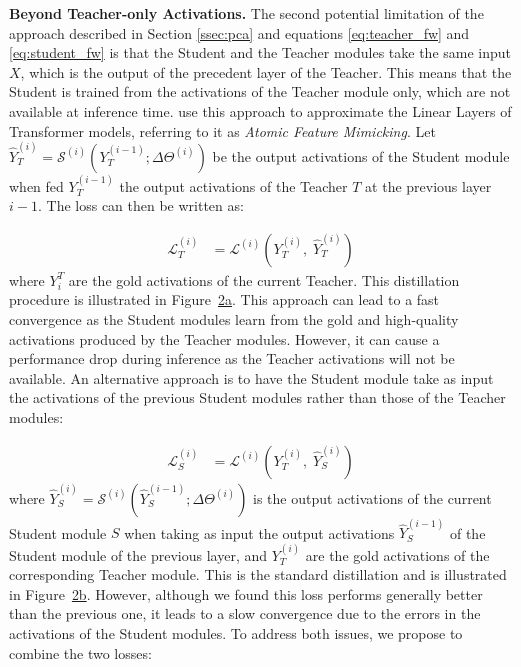 \documentclass[11pt]{article}
\newcommand{\myparagraph}[1]{\noindent\textbf{#1}}
\begin{document}
\myparagraph{Beyond Teacher-only Activations.} The second potential limitation of the approach described in Section \ref{ssec:pca} and equations \ref{eq:teacher_fw} and \ref{eq:student_fw} is that the Student and the Teacher modules take the same input $X$, which is the output of the precedent layer of the Teacher. This means that the Student is trained from the activations of the Teacher module only, which are not available at inference time. \citet{yu_compressing_2023} use this approach to approximate the Linear Layers of Transformer models, referring to it as \textit{Atomic Feature Mimicking}. Let $\widehat{Y}^{(i)}_{T} = \mathcal{S}^{(i)}(Y^{(i-1)}_{T}; \Delta \Theta^{(i)})$ be the output activations of the Student module when fed $Y^{(i-1)}_{T}$ the output activations of the Teacher $T$ at the previous layer $i-1$. The loss can then be written as:

\begingroup
\setlength{\abovedisplayskip}{0pt}
\setlength{\belowdisplayskip}{3pt}
{\small{
\begin{align}
    \label{eq:teacher_loss}
    \mathcal{L}^{(i)}_{T} &= \mathcal{L}^{(i)}(Y^{(i)}_{T}, \; \widehat{Y}^{(i)}_{T})
\end{align}
}}
\endgroup
where $Y^{T}_{i}$ are the gold activations of the current Teacher. This distillation procedure is illustrated in Figure~\hyperref[fig:teacher]{2a}. This approach can lead to a fast convergence as the Student modules learn from the gold and high-quality activations produced by the Teacher modules. However, it can cause a performance drop during inference as the Teacher activations will not be available. An alternative approach is to have the Student module take as input the activations of the previous Student modules rather than those of the Teacher modules:

\begingroup
\setlength{\abovedisplayskip}{0pt}
\setlength{\belowdisplayskip}{3pt}
{\small{
\begin{align}
    \label{eq:student_loss}
    \mathcal{L}^{(i)}_{S} &= \mathcal{L}^{(i)}(Y^{(i)}_{T}, \; \widehat{Y}^{(i)}_{S})
\end{align}
}}
\endgroup
where {\small{$\widehat{Y}^{(i)}_{S} =
\mathcal{S}^{(i)}(\widehat{Y}^{(i-1)}_{S}; \Delta \Theta^{(i)})$}} is the output
activations of the current Student module $S$ when taking as input the output
activations {\small{$\widehat{Y}^{(i-1)}_{S}$}} of the Student module of the
previous layer, and {\small{$Y^{(i)}_{T}$}} are the gold activations of the corresponding
Teacher module. This is the standard distillation and is illustrated in Figure~\hyperref[fig:student]{2b}.
However, although we found this loss performs
generally better than the previous one, it leads to a slow convergence due to
the errors in the activations of the Student modules. To address both issues,
we propose to combine the two losses:
\end{document}
